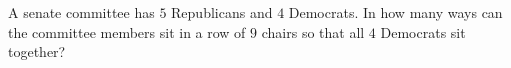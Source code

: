 A senate committee has $5$ Republicans and $4$ Democrats. In how many ways can the committee members sit in a row of $9$ chairs so that all $4$ Democrats sit together?
